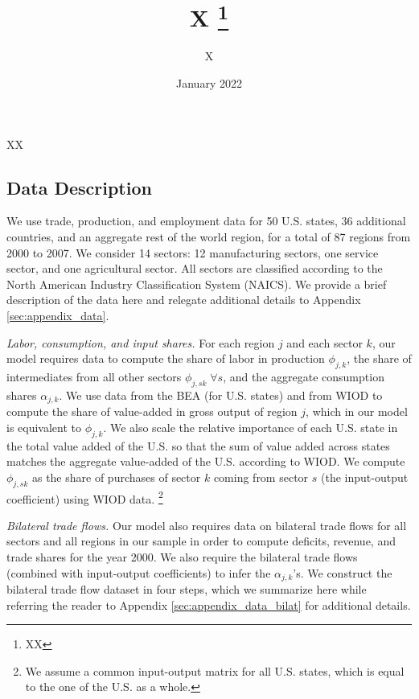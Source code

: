 \documentclass[12pt]{article}
\title{{X}%
\thanks{XX}}
\author{X}
\date{\vspace*{0.5cm} January 2022}
\begin{document}
\maketitle

\thispagestyle{empty}

\begin{small}
\begin{spacing}{1.4}
\noindent

\noindent
XX
\end{spacing}
\end{small}

\newpage


\subsection{Data Description}\label{sec:data}

We use trade, production, and employment data for 50 U.S. states, 36 additional countries, and an aggregate rest of the world region, for a total of 87 regions from 2000 to 2007. We consider 14 sectors: 12 manufacturing sectors, one service sector, and one agricultural sector. All sectors are classified according to the North American Industry Classification System (NAICS). We provide a brief description of the data here and relegate additional details to Appendix \ref{sec:appendix_data}. 

{\textit{Labor, consumption, and input shares.}} For each region $j$ and each sector $k$, our model requires data to compute the share of labor in production $\phi_{j,k}$, the share of intermediates from all other sectors $\phi_{j,sk}\; \forall s$, and the aggregate consumption shares $\alpha_{j,k}$. We use data from the BEA (for U.S. states) and from WIOD to compute the share of value-added in gross output of region $j$, which in our model is equivalent to $\phi_{j,k}$. 
We also scale the relative importance of each U.S. state in the total value added of the U.S. so that the sum of value added across states matches the aggregate value-added of the U.S. according to WIOD. We compute $\phi_{j,sk}$ as the share of purchases of sector $k$ coming from sector $s$ (the input-output coefficient) using WIOD data.%
\footnote{We assume a common input-output matrix for all U.S. states, which is equal to the one of the U.S. as a whole.}  

{\textit{Bilateral trade flows.}} Our model also requires data on bilateral trade flows for all sectors and all regions in our sample in order to compute deficits, revenue, and trade shares for the year 2000. We also require the bilateral trade flows (combined with input-output coefficients) to infer the $\alpha_{j,k}$'s. We construct the bilateral trade flow dataset in four steps, which we summarize here while referring the reader to Appendix \ref{sec:appendix_data_bilat} for additional details. 
\end{document}
